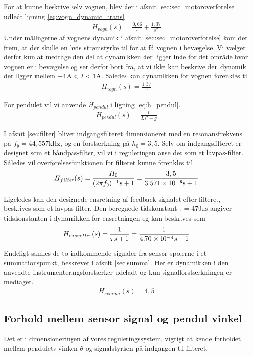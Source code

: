 For at kunne beskrive selv vognen, blev der i afsnit \ref{sec:sec_motoroverforelse} udledt ligning \ref{eq:vogn_dynamic_trans}
\begin{align}
H_{vogn}(s) =\frac{0,66}{s} + \frac{1,37}{s^2} 
\end{align}
Under målingerne af vognens dynamik i afsnit \ref{sec:sec_motoroverforelse} kom det frem, at der skulle en hvis strømstyrke til for at få vognen i bevægelse.
Vi vælger derfor kun at medtage den del at dynamikken der ligger inde for det område hvor vognen er i bevægelse og ser derfor bort fra, at vi ikke kan beskrive den dynamik der ligger mellem $-1 \si{\ampere} < I < 1 \si{\ampere}$. 
Således kan dynamikken for vognen forenkles til
\begin{align}
 H_{vogn}(s) = \frac{1,37}{s^2} 
\end{align}

For pendulet vil vi anvende $H_{pendul}$ i ligning \ref{eq:h_pendul}.
\begin{align}
H_{pendul}(s) = \frac{1}{Ls^2 - g} 
\end{align}

I afsnit \ref{sec:filter} bliver indgangsfilteret dimensioneret med en resonansfrekvens på $f_0 = 44,557 \si{\kilo\hertz}$, og en forstærkning på $h_0 = 3,5$. 
Selv om indgangsfilteret er designet som et båndpas-filter, vil vi i reguleringen anse det som et lavpas-filter.
Således vil overførelsesfunktionen for filteret kunne forenkles til 
\begin{align}
H_{filter}(s) = \frac{H_0}{(2 \pi f_0)^{-1}s +1} = \frac{3,5}{\num{3.571E-06}s +1}
\end{align}

Ligeledes kan den designede ensretning af feedback signalet efter filteret, beskrives som et lavpas-filter.
Den beregnede tidskonstant $\tau = 470 \si{\micro\second}$ angiver tidskonstanten i dynamikken for ensretningen og kan beskrives som
\begin{align}
H_{ensretter}(s) = \frac{1}{\tau s +1} = \frac{1}{\num{4.70E-4}s +1}
\end{align} 

Endeligt samles de to indkommende signaler fra sensor spolerne i et summationspunkt, beskrevet i afsnit \ref{sec:summa}.
Her er dynamikken i den anvendte instrumenteringsforstærker udeladt og kun signalforstærkningen er medtaget.
\begin{align}
H_{summa}(s) = 4,5
\end{align}  

\subsection{Forhold mellem sensor signal og pendul vinkel}
Det er i dimensioneringen af vores reguleringssystem, vigtigt at kende forholdet mellem pendulets vinken $\theta$ og signalstyrken på indgangen til filteret.


